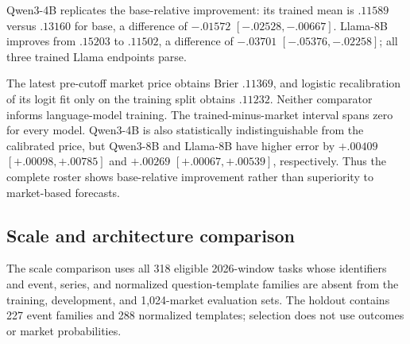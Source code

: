 \begin{center}
\begin{minipage}{.94\linewidth}
\centering
{}
\label{tab:exp4-endpoint-results}
\scriptsize
\setlength{\tabcolsep}{3.5pt}
\resizebox{\linewidth}{!}{}
\end{minipage}
\end{center}

\begin{center}
\begin{minipage}{.9\linewidth}
\centering
{}
\label{tab:exp3b-model-roster-results}
\scriptsize
\setlength{\tabcolsep}{3.5pt}
\resizebox{\linewidth}{!}{%

}
\end{minipage}
\end{center}

Qwen3-4B replicates the base-relative improvement: its trained mean is $.11589$
versus $.13160$ for base, a difference of $-.01572$
$[-.02528,-.00667]$. Llama-8B improves from $.15203$ to $.11502$, a difference
of $-.03701$ $[-.05376,-.02258]$; all three trained Llama endpoints parse.

The latest pre-cutoff market price obtains Brier $.11369$, and logistic
recalibration of its logit fit only on the training split obtains $.11232$.
Neither comparator informs language-model training. The trained-minus-market
interval spans zero for every model. Qwen3-4B is also statistically
indistinguishable from the calibrated price, but Qwen3-8B and Llama-8B have
higher error by $+.00409$ $[+.00098,+.00785]$ and $+.00269$
$[+.00067,+.00539]$, respectively. Thus the complete roster shows
base-relative improvement rather than superiority to market-based forecasts.

\subsection{Scale and architecture comparison}
\label{app:exp4-scale}

The scale comparison uses all 318 eligible 2026-window tasks whose identifiers and
event, series, and normalized question-template families are absent from the
training, development, and 1,024-market evaluation sets. The holdout contains 227
event families and 288 normalized templates; selection does not use outcomes or
market probabilities.

